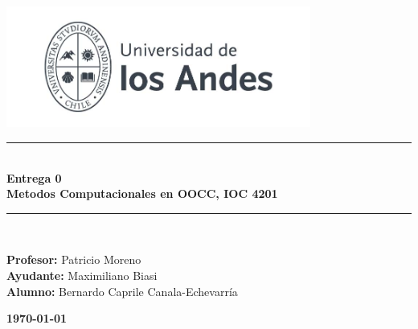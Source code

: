 \documentclass{article}
\begin{document}
\begin{titlepage}%
\newcommand{\HRule}{\rule{\linewidth}{0.5mm}} 
\center 
\includegraphics[width=10cm]{Logo principal.jpg}\\ %
\vspace{3cm}
\HRule \\[0.4cm]
{ \huge \bfseries Entrega 0}\\[0.4cm] %
{ \huge \bfseries Metodos Computacionales en OOCC, IOC 4201}\\[0.4cm] %
\HRule \\[1.5cm]
 \vspace{5cm}
\begin{flushright}
    { \textbf{Profesor:}
    Patricio Moreno\\
    \vspace{0.2cm}
    \textbf{Ayudante:}
    Maximiliano Biasi\\
    \vspace{0.2cm}
    \textbf{Alumno:}
    Bernardo Caprile Canala-Echevarría\\
}
\end{flushright}
\vspace{1cm}
{\large \textbf{\today}}\\[2cm] %
\end{titlepage}
\newpage
\tableofcontents
\newpage
\end{document}
